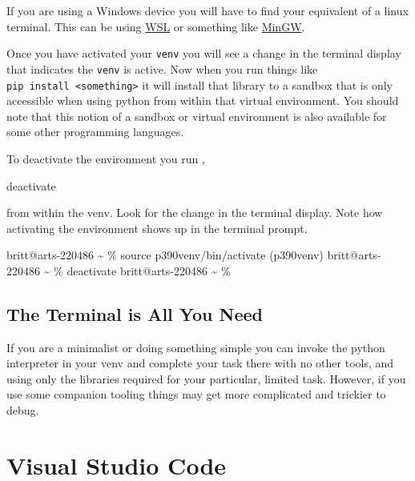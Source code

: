 \documentclass[
  letterpaper,
  DIV=11,
  numbers=noendperiod]{scrreprt}
\newenvironment{Shaded}{\begin{snugshade}}{\end{snugshade}}
\newcommand{\NormalTok}[1]{\textcolor[rgb]{0.00,0.23,0.31}{#1}}
\begin{document}
If you are using a Windows device you will have to find your equivalent
of a linux terminal. This can be using
\href{https://learn.microsoft.com/en-us/windows/wsl/install}{WSL} or
something like \href{https://en.wikipedia.org/wiki/MinGW}{MinGW}.

Once you have activated your \texttt{venv} you will see a change in the
terminal display that indicates the \texttt{venv} is active. Now when
you run things like
\texttt{pip\ install\ \textless{}something\textgreater{}} it will
install that library to a sandbox that is only accessible when using
python from within that virtual environment. You should note that this
notion of a sandbox or virtual environment is also available for some
other programming languages.

To deactivate the environment you run ,

\begin{Shaded}
\begin{Highlighting}[]
\NormalTok{deactivate}
\end{Highlighting}
\end{Shaded}

from within the venv. Look for the change in the terminal display. Note
how activating the environment shows up in the terminal prompt.

\begin{Shaded}
\begin{Highlighting}[]
\NormalTok{britt@arts{-}220486 \textasciitilde{} \% source p390venv/bin/activate}
\NormalTok{(p390venv) britt@arts{-}220486 \textasciitilde{} \% deactivate}
\NormalTok{britt@arts{-}220486 \textasciitilde{} \% }
\end{Highlighting}
\end{Shaded}

\subsection{The Terminal is All You
Need}\label{the-terminal-is-all-you-need}

If you are a minimalist or doing something simple you can invoke the
python interpreter in your venv and complete your task there with no
other tools, and using only the libraries required for your particular,
limited task. However, if you use some companion tooling things may get
more complicated and trickier to debug.

\section{Visual Studio Code}\label{visual-studio-code}
\end{document}
